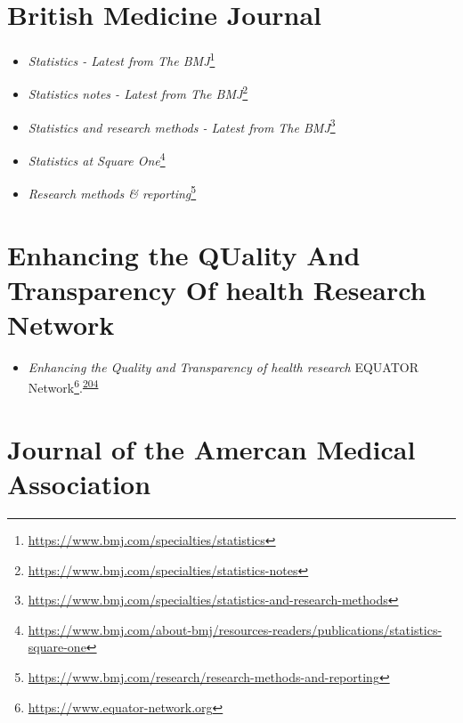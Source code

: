 \documentclass[
  a4paper,
]{book}
\providecommand{\tightlist}{%
  \setlength{\itemsep}{0pt}\setlength{\parskip}{0pt}}
\renewcommand{\href}[2]{#2\footnote{\url{#1}}}
\begin{document}
\hypertarget{british-medicine-journal}{%
\section*{British Medicine Journal}\label{british-medicine-journal}}

\begin{itemize}
\item
  \href{https://www.bmj.com/specialties/statistics}{\emph{Statistics - Latest from The BMJ}}
\item
  \href{https://www.bmj.com/specialties/statistics-notes}{\emph{Statistics notes - Latest from The BMJ}}
\item
  \href{https://www.bmj.com/specialties/statistics-and-research-methods}{\emph{Statistics and research methods - Latest from The BMJ}}
\item
  \href{https://www.bmj.com/about-bmj/resources-readers/publications/statistics-square-one}{\emph{Statistics at Square One}}
\item
  \href{https://www.bmj.com/research/research-methods-and-reporting}{\emph{Research methods \& reporting}}
\end{itemize}

\hypertarget{enhancing-the-quality-and-transparency-of-health-research-network}{%
\section*{Enhancing the QUality And Transparency Of health Research Network}\label{enhancing-the-quality-and-transparency-of-health-research-network}}

\begin{itemize}
\tightlist
\item
  \emph{Enhancing the Quality and Transparency of health research} \href{https://www.equator-network.org}{EQUATOR Network}.\textsuperscript{\protect\hyperlink{ref-Altman2008}{204}}
\end{itemize}

\hypertarget{journal-of-the-amercan-medical-association}{%
\section*{Journal of the Amercan Medical Association}\label{journal-of-the-amercan-medical-association}}
\end{document}
